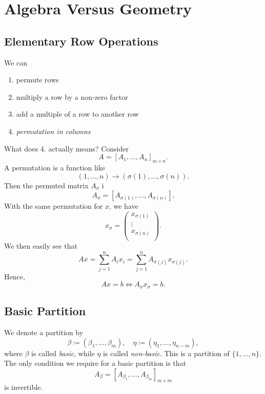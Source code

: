 \chapter{Algebra Versus Geometry}
\section{Elementary Row Operations}
We can
\begin{enumerate}
	\item permute rows
	\item multiply a row by a non-zero factor
	\item add a multiple of a row to another row
	\item \emph{permutation in columns}
\end{enumerate}
What does 4. actually means?
Consider
\[
	A = \left[ A_1, \ldots , A_n \right]_{m\times n} .
\]
A permutation is a function like
\[
	(1, \ldots , n) \to (\sigma(1), \ldots , \sigma(n)).
\]
Then the permuted matrix \(A_{\sigma}\) i
\[
	A_{\sigma} = \left[ A_{\sigma(1)}, \ldots , A_{\sigma(n)} \right].
\]
With the same permutation for \(x\), we have
\[
	x_{\sigma} = \begin{pmatrix}
		x_{\sigma(1)} \\
		\vdots        \\
		x_{\sigma(n)} \\
	\end{pmatrix}.
\]
We then easily see that
\[
	Ax = \sum\limits_{j=1}^{n} A_i x_i = \sum\limits_{j=1}^{n} A_{\sigma(j)}x_{\sigma(j)}.
\]
Hence,
\[
	Ax = b \iff A_{\sigma} x_{\sigma} = b.
\]

\section{Basic Partition}
We denote a partition by
\[
	\beta \coloneqq (\beta_1, \ldots , \beta_m),\quad \eta \coloneqq (\eta_1, \ldots , \eta_{n-m}),
\]
where \(\beta\) is called \emph{basic}, while \(\eta\) is called \emph{non-basic}. This is a partition of \(\{1, \ldots , n\}\).
The only condition we require for a basic partition is that
\[
	A_{\beta} = \left[ A_{\beta_1}, \ldots , A_{\beta_m} \right]_{m\times m}
\]
is invertible.

